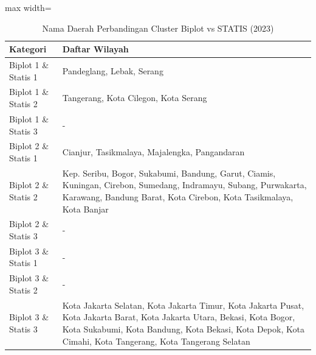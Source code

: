 \begin{table}[H]
\centering
\caption{Nama Daerah Perbandingan Cluster Biplot vs STATIS (2023)} \label{tab:appbiplot_statis_comp_name_2023}
\begin{adjustbox}{max width=\textwidth}
\begin{tabular}{|p{4cm}|p{10cm}|}
\hline
\textbf{Kategori} & \textbf{Daftar Wilayah} \\
\hline
Biplot 1 \& Statis 1 & Pandeglang, Lebak, Serang \\
\hline
Biplot 1 \& Statis 2 & Tangerang, Kota Cilegon, Kota Serang \\
\hline
Biplot 1 \& Statis 3 & - \\
\hline
Biplot 2 \& Statis 1 & Cianjur, Tasikmalaya, Majalengka, Pangandaran \\
\hline
Biplot 2 \& Statis 2 & Kep. Seribu, Bogor, Sukabumi, Bandung, Garut, Ciamis, Kuningan, Cirebon, Sumedang, Indramayu, Subang, Purwakarta, Karawang, Bandung Barat, Kota Cirebon, Kota Tasikmalaya, Kota Banjar \\
\hline
Biplot 2 \& Statis 3 & - \\
\hline
Biplot 3 \& Statis 1 & - \\
\hline
Biplot 3 \& Statis 2 & - \\
\hline
Biplot 3 \& Statis 3 & Kota Jakarta Selatan, Kota Jakarta Timur, Kota Jakarta Pusat, Kota Jakarta Barat, Kota Jakarta Utara, Bekasi, Kota Bogor, Kota Sukabumi, Kota Bandung, Kota Bekasi, Kota Depok, Kota Cimahi, Kota Tangerang, Kota Tangerang Selatan \\
\hline
\end{tabular}
\end{adjustbox}
\end{table}